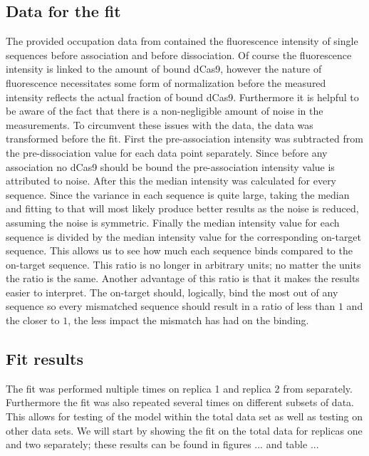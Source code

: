 \subsection{Data for the fit}
The provided occupation data from \cite{PNAS} contained the fluorescence intensity of single sequences before association and before dissociation. Of course the fluorescence intensity is linked to the amount of bound dCas9, however the nature of fluorescence necessitates some form of normalization before the measured intensity reflects the actual fraction of bound dCas9. Furthermore it is helpful to be aware of the fact that there is a non-negligible amount of noise in the measurements. %
To circumvent these issues with the data, the data was transformed before the fit. First the pre-association intensity was subtracted from the pre-dissociation value for each data point separately. Since before any association no dCas9 should be bound the pre-association intensity value is attributed to noise. After this the median intensity was calculated for every sequence. Since the variance in each sequence is quite large, taking the median and fitting to that will most likely produce better results as the noise is reduced, assuming the noise is symmetric. Finally the median intensity value for each sequence is divided by the median intensity value for the corresponding on-target sequence. This allows us to see how much each sequence binds compared to the on-target sequence. This ratio is no longer in arbitrary units; no matter the units the ratio is the same. Another advantage of this ratio is that it makes the results easier to interpret. The on-target should, logically, bind the most out of any sequence so every mismatched sequence should result in a ratio of less than $1$ and the closer to $1$, the less impact the mismatch has had on the binding.


\subsection{Fit results}
\label{sec:minmodelresults}


The fit was performed nultiple times on replica 1 and replica 2 from \cite{PNAS} separately. Furthermore the fit was also repeated several times on different subsets of data. This allows for testing of the model within the total data set as well as testing on other data sets. We will start by showing the fit on the total data for replicas one and two separately; these results can be found in figures ... and table ... %


